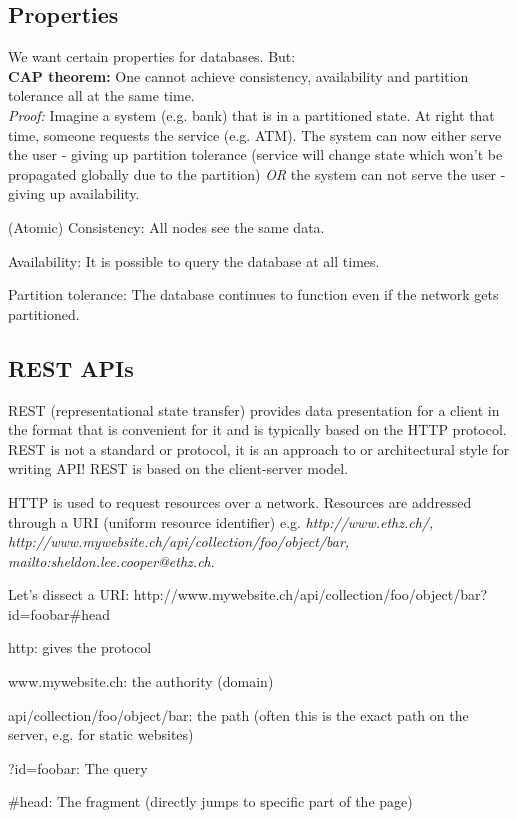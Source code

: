 \documentclass[11pt,oneside,a4paper]{article}
\begin{document}
\subsection{Properties}

We want certain properties for databases. But:\\
\textbf{CAP theorem:} One cannot achieve consistency, availability and partition tolerance all at the same time.\\
\textit{Proof:} Imagine a system (e.g. bank) that is in a partitioned state. At right that time, someone requests the service (e.g. ATM). The system can now either serve the user - giving up partition tolerance (service will change state which won't be propagated globally due to the partition) \textit{OR} the system can not serve the user - giving up availability.

\begin{compactitem}
	\item (Atomic) Consistency:	All nodes see the same data.
	\item Availability:	It is possible to query the database at all times.
	\item Partition tolerance: The database continues to function even if the network gets partitioned.\\
\end{compactitem}

\subsection{REST APIs}

REST (representational state transfer) provides data presentation for a client in the format that is convenient for it and is typically based on the HTTP protocol. REST is not a standard or protocol, it is an approach to or architectural style for writing API! REST is based on the client-server model.

HTTP is used to request resources over a network. Resources are addressed through a URI (uniform resource identifier) e.g. \textit{http://www.ethz.ch/, http://www.mywebsite.ch/api/collection/foo/object/bar, mailto:sheldon.lee.cooper@ethz.ch}.

Let's dissect a URI: http://www.mywebsite.ch/api/collection/foo/object/bar?id=foobar\#head

\begin{compactitem}
	\item http: gives the protocol
	\item www.mywebsite.ch: the authority (domain)
	\item api/collection/foo/object/bar: the path (often this is the exact path on the server, e.g. for static websites)
	\item ?id=foobar: The query
	\item \#head: The fragment (directly jumps to specific part of the page)
\end{compactitem}
\end{document}
